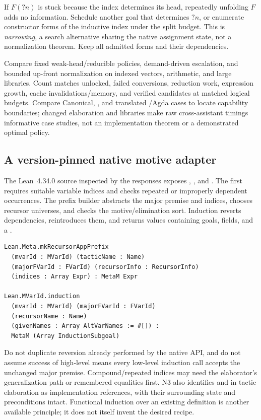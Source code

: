 If $F(?n)$ is stuck because the index determines its head, repeatedly unfolding
$F$ adds no information. Schedule another goal that determines $?n$, or
enumerate constructor forms of the inductive index under the split budget.
This is \emph{narrowing}, a search alternative sharing the native assignment
state, not a normalization theorem. Keep all admitted forms and their
dependencies.

Compare fixed weak-head/reducible policies, demand-driven escalation, and
bounded up-front normalization on indexed vectors, arithmetic, and large
libraries. Count matches unlocked, failed conversions, reduction work,
expression growth, cache invalidations/memory, and verified candidates at
matched logical budgets. Compare Canonical, , and translated
/Agda cases to locate capability boundaries; changed elaboration
and libraries make raw cross-assistant timings informative case studies,
not an implementation theorem or a demonstrated optimal policy.

\subsection{A version-pinned native motive adapter}\label{sec:dependent-adapter}

The Lean~4.34.0 source inspected by the responses exposes
,
, and .
The first requires suitable variable indices and checks repeated or improperly
dependent occurrences. The prefix builder abstracts the major premise and
indices, chooses recursor universes, and checks the motive/elimination sort.
Induction reverts dependencies, reintroduces them, and returns
 values containing goals, fields, and a
.\cite{leaninduction}

\begin{lstlisting}[caption={Signatures reported from the pinned source; integration still needs compilation tests.}]
Lean.Meta.mkRecursorAppPrefix
  (mvarId : MVarId) (tacticName : Name)
  (majorFVarId : FVarId) (recursorInfo : RecursorInfo)
  (indices : Array Expr) : MetaM Expr

Lean.MVarId.induction
  (mvarId : MVarId) (majorFVarId : FVarId)
  (recursorName : Name)
  (givenNames : Array AltVarNames := #[]) :
  MetaM (Array InductionSubgoal)
\end{lstlisting}
Do not duplicate reversion already performed by the native API, and do not
assume success of high-level  means every low-level induction call
accepts the unchanged major premise. Compound/repeated indices may need the
elaborator's generalization path or remembered equalities first. N3 also
identifies  and  in tactic
elaboration as implementation references, with their surrounding state and
preconditions intact. Functional induction over an existing definition is
another available principle; it does not itself invent the desired recipe.\cite{leanfuninduction,lean418}

